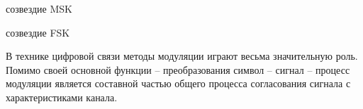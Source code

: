 \documentclass[a4paper,12pt]{article}
\begin{document}
\begin{enumerate}
{ созвездие MSK
\\}

{ созвездие FSK
\\}

{\bfseries{}}

В технике цифровой связи методы модуляции играют весьма значительную роль. Помимо своей основной функции – преобразования символ – сигнал – процесс модуляции является составной частью общего процесса согласования сигнала с характеристиками канала.


\end{enumerate}
\end{document}
